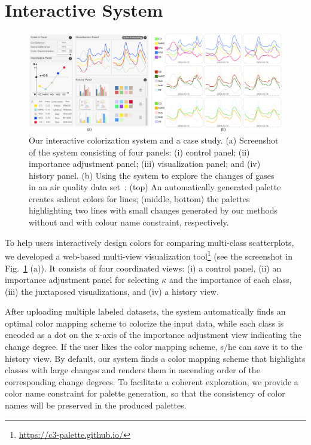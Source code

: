 \section{Interactive System}


\begin{figure}[ht]
\centering
\includegraphics[width=1.0\columnwidth]{figures/interface.pdf}
\caption{Our interactive colorization system and a case study. (a) Screenshot of the system consisting of four panels: (i) control panel; (ii) importance adjustment panel; (iii) visualization panel; and (iv) history panel. (b) Using the system to explore the changes of gases in an air quality data set~\cite{DEVITO2008750}: (top) An automatically generated palette creates salient colors for lines; (middle, bottom) the palettes highlighting two lines with small changes generated by our methods without and with colour name constraint, respectively.}
\vspace*{-3mm}
\label{fig:ui-case}
\end{figure}

\label{sec:interaction}
To help users interactively design colors for comparing multi-class scatterplots, we developed a web-based multi-view visualization tool\footnote{\small \url{https://c3-palette.github.io/}}
(see the screenshot in Fig.~\ref{fig:ui-case} (a)).
It consists of four coordinated views: (i) a control panel, (ii) an importance adjustment panel for selecting $\kappa$ and  the importance of each class, (iii) the juxtaposed visualizations, and (iv) a history view.

After uploading multiple labeled datasets, the system automatically finds an optimal color mapping scheme to colorize the input data, while each class is encoded as a dot on the x-axis of the importance adjustment view indicating the change degree. If the user likes the color mapping scheme, s/he can save it to the history view. By default, our system finds a color mapping scheme that highlights classes with large changes and renders them in ascending order of the corresponding change degrees.
To facilitate a coherent exploration, we provide a color name constraint for palette generation, so that the consistency of color names will be preserved in the produced palettes.









